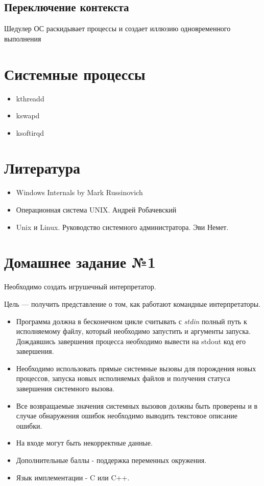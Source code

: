 \documentclass[../../lectures.tex]{subfiles}
\begin{document}
\subsection{Переключение контекста}
Шедулер ОС раскидывает процессы и создает иллюзию одновременного выполнения

\section{Системные процессы}
\begin{itemize}
    \item kthreadd
    \item kswapd
    \item ksoftirqd
\end{itemize}

\section{Литература}
\begin{itemize}
    \item Windows Internals by Mark Russinovich
    \item Операционная система UNIX. Андрей Робачевский
    \item Unix и Linux. Руководство системного администратора. Эви Немет.
\end{itemize}

\section{Домашнее задание №1} 
Необходимо создать игрушечный интерпретатор.

Цель --- получить представление о том, как работают командные интерпретаторы.
\begin{itemize}
    \item Программа должна в бесконечном цикле считывать с \emph{stdin} полный путь к
          исполняемому файлу, который необходимо запустить и аргументы запуска.
          Дождавшись завершения процесса необходимо вывести на stdout код его завершения.

    \item Необходимо использовать прямые системные вызовы для порождения новых процессов,
          запуска новых исполняемых файлов и получения статуса завершения системного
          вызова.

    \item Все возвращаемые значения системных вызовов должны быть проверены и в случае
          обнаружения ошибок необходимо выводить текстовое описание ошибки.

    \item На входе могут быть некорректные данные.

    \item Дополнительные баллы - поддержка переменных окружения.

    \item Язык имплементации - C или C++.
\end{itemize}
\end{document}

